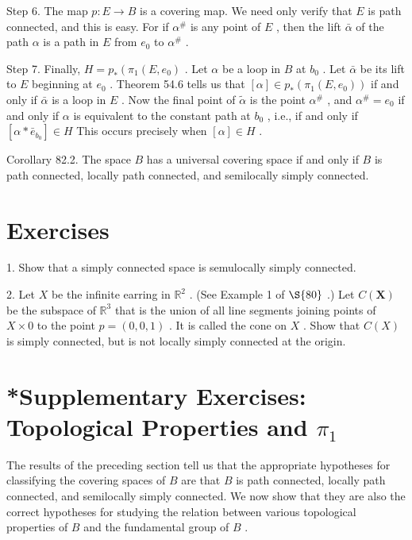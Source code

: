 Step 6. The map \(p : E \rightarrow  B\) is a covering map. We need only verify that \(E\) is path connected, and this is easy. For if \({\alpha }^{\# }\) is any point of \(E\) , then the lift \(\bar{\alpha }\) of the path \(\alpha\) is a path in \(E\) from \({e}_{0}\) to \({\alpha }^{\# }\) .

Step 7. Finally, \(H = {p}_{ * }\left( {{\pi }_{1}\left( {E,{e}_{0}}\right) }\right.\) . Let \(\alpha\) be a loop in \(B\) at \({b}_{0}\) . Let \(\bar{\alpha }\) be its lift to \(E\) beginning at \({e}_{0}\) . Theorem 54.6 tells us that \(\left\lbrack  \alpha \right\rbrack   \in  {p}_{ * }\left( {{\pi }_{1}\left( {E,{e}_{0}}\right) }\right)\) if and only if \(\bar{\alpha }\) is a loop in \(E\) . Now the final point of \(\widetilde{\alpha }\) is the point \({\alpha }^{\# }\) , and \({\alpha }^{\# } = {e}_{0}\) if and only if \(\alpha\) is equivalent to the constant path at \({b}_{0}\) , i.e., if and only if \(\left\lbrack  {\alpha  * {\bar{e}}_{{b}_{0}}}\right\rbrack   \in  H\) This occurs precisely when \(\left\lbrack  \alpha \right\rbrack   \in  H\) .

Corollary 82.2. The space \(B\) has a universal covering space if and only if \(B\) is path connected, locally path connected, and semilocally simply connected.

\section*{Exercises}

1. Show that a simply connected space is semulocally simply connected.

2. Let \(X\) be the infinite earring in \({\mathbb{R}}^{2}\) . (See Example 1 of \( \S {80}\) .) Let \(C\left( \mathbf{X}\right)\) be the subspace of \({\mathbb{R}}^{3}\) that is the union of all line segments joining points of \(X \times  0\) to the point \(p = \left( {0,0,1}\right)\) . It is called the cone on \(X\) . Show that \(C\left( X\right)\) is simply connected, but is not locally simply connected at the origin.

\section*{*Supplementary Exercises: Topological Properties and \({\pi }_{1}\)}

The results of the preceding section tell us that the appropriate hypotheses for classifying the covering spaces of \(B\) are that \(B\) is path connected, locally path connected, and semilocally simply connected. We now show that they are also the correct hypotheses for studying the relation between various topological properties of \(B\) and the fundamental group of \(B\) .

